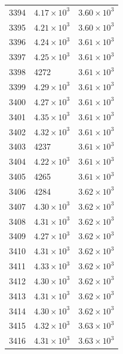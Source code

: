 \begin{table}[H]
\begin{tabular}{lll}
3394 & $\displaystyle 4.17 \times 10^{3}$ & $\displaystyle 3.60 \times 10^{3}$ \\
3395 & $\displaystyle 4.21 \times 10^{3}$ & $\displaystyle 3.60 \times 10^{3}$ \\
3396 & $\displaystyle 4.24 \times 10^{3}$ & $\displaystyle 3.61 \times 10^{3}$ \\
3397 & $\displaystyle 4.25 \times 10^{3}$ & $\displaystyle 3.61 \times 10^{3}$ \\
3398 & 4272 & $\displaystyle 3.61 \times 10^{3}$ \\
3399 & $\displaystyle 4.29 \times 10^{3}$ & $\displaystyle 3.61 \times 10^{3}$ \\
3400 & $\displaystyle 4.27 \times 10^{3}$ & $\displaystyle 3.61 \times 10^{3}$ \\
3401 & $\displaystyle 4.35 \times 10^{3}$ & $\displaystyle 3.61 \times 10^{3}$ \\
3402 & $\displaystyle 4.32 \times 10^{3}$ & $\displaystyle 3.61 \times 10^{3}$ \\
3403 & 4237 & $\displaystyle 3.61 \times 10^{3}$ \\
3404 & $\displaystyle 4.22 \times 10^{3}$ & $\displaystyle 3.61 \times 10^{3}$ \\
3405 & 4265 & $\displaystyle 3.61 \times 10^{3}$ \\
3406 & 4284 & $\displaystyle 3.62 \times 10^{3}$ \\
3407 & $\displaystyle 4.30 \times 10^{3}$ & $\displaystyle 3.62 \times 10^{3}$ \\
3408 & $\displaystyle 4.31 \times 10^{3}$ & $\displaystyle 3.62 \times 10^{3}$ \\
3409 & $\displaystyle 4.27 \times 10^{3}$ & $\displaystyle 3.62 \times 10^{3}$ \\
3410 & $\displaystyle 4.31 \times 10^{3}$ & $\displaystyle 3.62 \times 10^{3}$ \\
3411 & $\displaystyle 4.33 \times 10^{3}$ & $\displaystyle 3.62 \times 10^{3}$ \\
3412 & $\displaystyle 4.30 \times 10^{3}$ & $\displaystyle 3.62 \times 10^{3}$ \\
3413 & $\displaystyle 4.31 \times 10^{3}$ & $\displaystyle 3.62 \times 10^{3}$ \\
3414 & $\displaystyle 4.30 \times 10^{3}$ & $\displaystyle 3.62 \times 10^{3}$ \\
3415 & $\displaystyle 4.32 \times 10^{3}$ & $\displaystyle 3.63 \times 10^{3}$ \\
3416 & $\displaystyle 4.31 \times 10^{3}$ & $\displaystyle 3.63 \times 10^{3}$ \\

\end{tabular}
\end{table}
